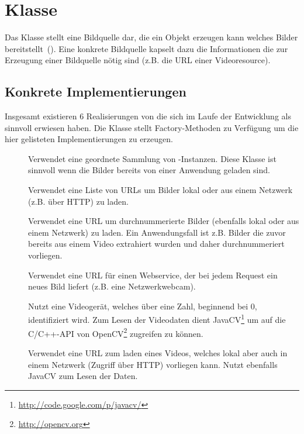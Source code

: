 \section{Klasse }
Das Klasse  stellt eine Bildquelle dar, die ein Objekt erzeugen kann welches Bilder bereitstellt~().
Eine konkrete Bildquelle kapselt dazu die Informationen die zur Erzeugung einer Bildquelle nötig sind (z.B. die URL einer Videoresource).


\subsection*{Konkrete Implementierungen}
Insgesamt existieren 6 Realisierungen von  die sich im Laufe der Entwicklung als sinnvoll erwiesen haben.
Die Klasse  stellt Factory-Methoden zu Verfügung um die hier gelisteten Implementierungen zu erzeugen.

{
\setlength{\leftmargini}{1.5em}
\setlength{\labelsep}{\textwidth}
\begin{description}
  \item[]
    Verwendet eine geordnete Sammlung von -Instanzen.
    Diese Klasse ist sinnvoll wenn die Bilder bereits von einer Anwendung geladen sind.
  \item[]
    Verwendet eine Liste von URLs um Bilder lokal oder aus einem Netzwerk (z.B. über HTTP) zu laden.
  \item[]
    Verwendet eine URL um durchnummerierte Bilder (ebenfalls lokal oder aus einem Netzwerk) zu laden.
    Ein Anwendungsfall ist z.B. Bilder die zuvor bereits aus einem Video extrahiert wurden und daher durchnummeriert vorliegen.
  \item[]
    Verwendet eine URL für einen Webservice, der bei jedem Request ein neues Bild liefert (z.B. eine Netzwerkwebcam).
  \item[]
    Nutzt eine Videogerät, welches über eine Zahl, beginnend bei 0, identifiziert wird.
    Zum Lesen der Videodaten dient JavaCV\footnote{\url{http://code.google.com/p/javacv/}} um auf die C/C++-API von OpenCV\footnote{\url{http://opencv.org}} zugreifen zu können.
  \item[]
    Verwendet eine URL zum laden eines Videos, welches lokal aber auch in einem Netzwerk (Zugriff über HTTP) vorliegen kann.
    Nutzt ebenfalls JavaCV zum Lesen der Daten.
\end{description}
}

